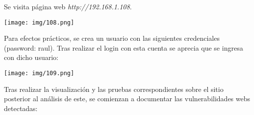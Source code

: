 \documentclass[12pt,oneside,a4paper]{book}
\begin{document}
\vspace{1em}

\hspace{20pt}
Se visita página web \textit{http://192.168.1.108}.

\vspace{1em}

\begin{center}
    \texttt{[image: img/108.png]}
\end{center}

\vspace{1em}

\hspace{20pt}
Para efectos prácticos, se crea un usuario con las siguientes credenciales (password: raul). Tras realizar el login con esta cuenta se aprecia que se ingresa con dicho usuario:

\vspace{1em}

\begin{center}
    \texttt{[image: img/109.png]}
\end{center}

\vspace{1em}

\hspace{20pt}
Tras realizar la visualización y las pruebas correspondientes sobre el sitio posterior al análisis de este, se comienzan a documentar las vulnerabilidades webs detectadas:

\vspace{1em}
\end{document}
